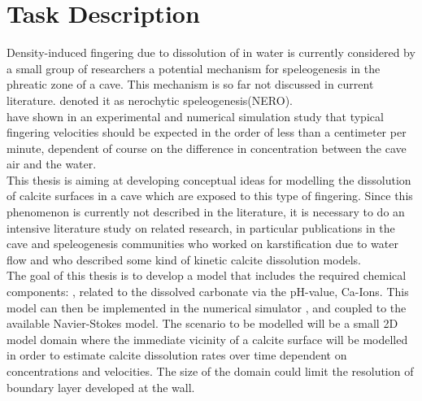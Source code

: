 \chapter*{Task Description}
\thispagestyle{empty}

Density-induced fingering due to dissolution of  in water is currently considered by a small group of researchers a potential mechanism for speleogenesis in the phreatic zone of a cave. This mechanism is so far not discussed in current literature. \citet{Scherzer2017} denoted it as nerochytic speleogenesis(NERO).\\
\citet{Class2020} have shown in an experimental and numerical simulation study that typical fingering velocities should be expected in the order of less than a centimeter per minute, dependent of course on the difference in  concentration between the cave air and the water. \\

This thesis is aiming at developing conceptual ideas for modelling the dissolution of calcite surfaces in a cave which are exposed to this type of fingering. Since this phenomenon is currently not described in the literature, it is necessary to do an intensive literature study on related research, in particular publications in the cave and speleogenesis communities who worked on karstification due to water flow and who described some kind of kinetic
calcite dissolution models.\\

The goal of this thesis is to develop a model that includes the required chemical components: , related to the dissolved carbonate via the pH-value, Ca-Ions. This model can then be implemented in the numerical simulator \DuMuX \citep{Koch2020}, and coupled to the available Navier-Stokes model. The scenario to be modelled will be a small 2D model domain where the immediate vicinity of a calcite surface will be modelled in order to estimate calcite dissolution rates over time dependent on  concentrations and velocities. The size of the domain could limit the resolution of boundary layer developed at the wall.

\endinput


